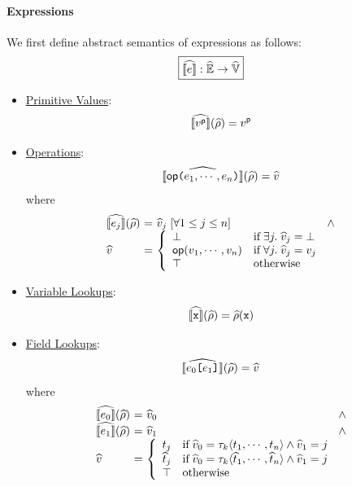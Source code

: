 \paragraph{Expressions} We first define abstract semantics of expressions as
follows:
\[
  \framebox{$\asem{\expr}: \aenvset \rightarrow \avalset$}
\]
\begin{itemize}
  \item \underline{Primitive Values}:
    \[
      \widehat{\llbracket{v^{\textsf{p}}}\rrbracket}(\widehat{\rho}) = v^{\textsf{p}}
    \]
  \item \underline{Operations}:
    \[
      \widehat{\llbracket{\textsf{op}\texttt{(}e_1, \cdots, e_n \texttt{)}}\rrbracket}(\widehat{\rho}) = \widehat{v}
    \]
    where
    \[
      \begin{array}{l@{~}c@{~}l@{~}l}
        \asem{\expr_j}(\aenv) &=& \aval_j \; [\forall 1 \leq j \leq n]
        &\wedge\\
        \aval &=& \left\{
          \begin{array}{ll}
            \bot & \text{if} \; \exists j. \; \aval_j = \bot\\

            \op(\val_1, \cdots, \val_n) &
            \text{if} \; \forall j. \; \aval_j = \val_j\\

            \top & \text{otherwise}\\
          \end{array}
        \right.\\
      \end{array}
    \]
  \item \underline{Variable Lookups}:
    \[
      \widehat{\llbracket{\texttt{x}}\rrbracket}(\widehat{\rho}) = \widehat{\rho}(\texttt{x})
    \]
  \item \underline{Field Lookups}:
    \[
      \widehat{\llbracket{e_0 \texttt{[}e_1 \texttt{]}}\rrbracket}(\widehat{\rho}) = \widehat{v}
    \]
    where
    \[
      \begin{array}{l@{~}c@{~}l@{~}l}
        \asem{\expr_0}(\aenv) &=& \aval_0 &\wedge\\
        \asem{\expr_1}(\aenv) &=& \aval_1 &\wedge\\
        \aval &=& \left\{
          \begin{array}{ll}
            \tree_j & \text{if} \;
            \aval_0 = \ty_k \langle \tree_1, \cdots, \tree_n \rangle \wedge
            \aval_1 = j\\

            \atree_j & \text{if} \;
            \aval_0 = \ty_k \langle \atree_1, \cdots, \atree_n \rangle \wedge
            \aval_1 = j\\

            \top & \text{otherwise}\\
          \end{array}
        \right.\\
      \end{array}
    \]
\end{itemize}

